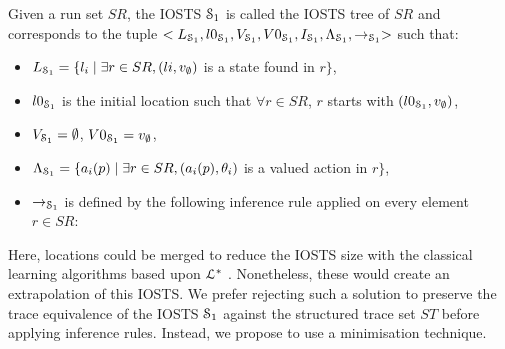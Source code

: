 \begin{definition}%
\label{IOSTS_tree}

Given a run set $SR$, the IOSTS $\EuScript{S}_1$ is called the
IOSTS tree of $SR$ and corresponds to the tuple
$<L_{\EuScript{S}_1}, l0_{\EuScript{S}_1},V_{\EuScript{S}_1},
V0_{\EuScript{S}_1}, I_{\EuScript{S}_1},
\Lambda_{\EuScript{S}_1},\rightarrow_{\EuScript{S}_1}>$ such
that:
\begin{itemize}

\item $L_{\EuScript{S}_1}= \{l_i \mid \exists r\in SR, (li,v_\emptyset)$ is
a state found in $r\}$,

\item $l0_{\EuScript{S}_1}$ is the initial location such that $\forall r \in
SR$, $r$ starts with $(l0_{\EuScript{S}_1},v_\emptyset)$,

\item $V_{\EuScript{S}_1}=\emptyset$, $V0_{\EuScript{S}_1}=v_\emptyset$,

\item $\Lambda_{\EuScript{S}_1}= \{a_i(p) \mid \exists r\in SR,
(a_i(p),\theta_i)$ is a valued action in $r\}$,

\item $\rightarrow_{\EuScript{S}_1}$ is defined by the following inference
rule applied on every element $r\in SR$:
\end{itemize}
\noindent{}
\end{definition}

Here, locations could be merged to reduce the IOSTS size with the
classical learning algorithms based upon $\EuScript{L}^*$
\cite{Angluin198787,lambeau08}. Nonetheless, these
would create an extrapolation of this IOSTS. We prefer rejecting
such a solution to preserve the trace equivalence of the IOSTS
$\EuScript{S}_1$ against the structured trace set $ST$ before
applying inference rules. Instead, we propose to use a
minimisation technique.

